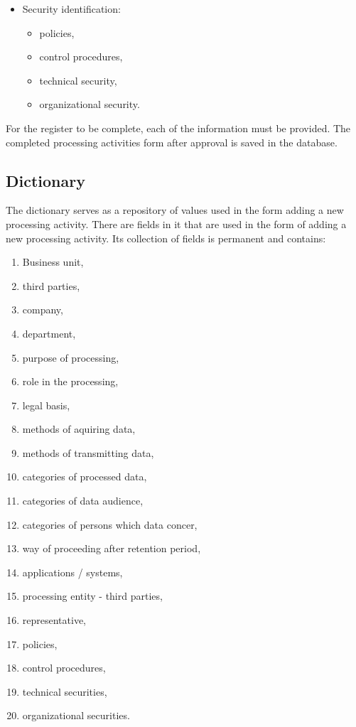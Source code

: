 \documentclass[en, noamssymb]{mgr}
\begin{document}
\begin{itemize}
\begin{itemize}
\end{itemize}

\item Security identification:

\begin{itemize}

\item policies,
\item control procedures,
\item technical security,
\item organizational security.

\end{itemize}

\end{itemize}

For the register to be complete, each of the information must be provided. The completed processing activities form after approval is saved in the database.

\subsection{Dictionary}

The dictionary serves as a repository of values used in the form adding a new processing activity. There are fields in it that are used in the form of adding a new processing activity. Its collection of fields is permanent and contains:

\begin{enumerate}

\item Business unit,
\item third parties,
\item company,
\item department,
\item purpose of processing,
\item role in the processing,
\item legal basis,
\item methods of aquiring data,
\item methods of transmitting data,
\item categories of processed data,
\item categories of data audience,
\item categories of persons which data concer,
\item way of proceeding after retention period,
\item applications / systems,
\item processing entity - third parties,
\item representative,
\item policies,
\item control procedures,
\item technical securities,
\item organizational securities.


\end{enumerate}
\end{document}
